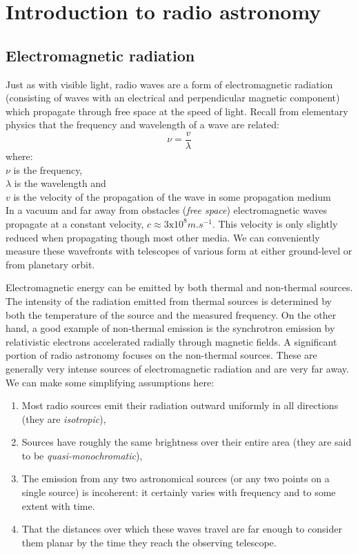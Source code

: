 \documentclass[a4paper,10pt]{report}
\begin{document}
\section{Introduction to radio astronomy}
\subsection{Electromagnetic radiation}
Just as with visible light, radio waves are a form of electromagnetic radiation (consisting of waves with an electrical and perpendicular magnetic component) which propagate through free space at the speed 
of light. Recall from elementary physics that the frequency and wavelength of a wave are related:
\begin{equation*}
 \nu = \frac{v}{\lambda}
\end{equation*}
where:\\
$\nu$ is the frequency,\\
$\lambda$ is the wavelength and\\
$v$ is the velocity of the propagation of the wave in some propagation medium\\

In a vacuum and far away from obstacles (\textit{free space}) electromagnetic waves propagate at a constant velocity, $c\approx 3\text{x}10^8m.s^{-1}$. This velocity is only slightly reduced
when propagating though most other media. We can conveniently measure these wavefronts with telescopes of various form at either ground-level or from planetary orbit. 

Electromagnetic energy can be emitted by both thermal and non-thermal sources. The intensity of the radiation emitted from thermal sources is determined by both the temperature of the source and the measured frequency. On the other hand, a good example of non-thermal emission is the 
synchrotron emission by relativistic electrons accelerated radially through magnetic fields. A significant portion of radio astronomy focuses on the non-thermal sources. These are generally very intense sources of 
electromagnetic radiation and are very far away. We can make some simplifying assumptions here:
\begin{enumerate}
 \item Most radio sources emit their radiation outward uniformly in all directions (they are \textit{isotropic}),
 \item Sources have roughly the same brightness over their entire area (they are said to be \textit{quasi-monochromatic}), 
 \item The emission from any two astronomical sources (or any two points on a single source) is incoherent: it certainly
 varies with frequency and to some extent with time.
 \item That the distances over which these waves travel are far enough to consider them planar by the time they reach the observing telescope.
\end{enumerate}
\end{document}
